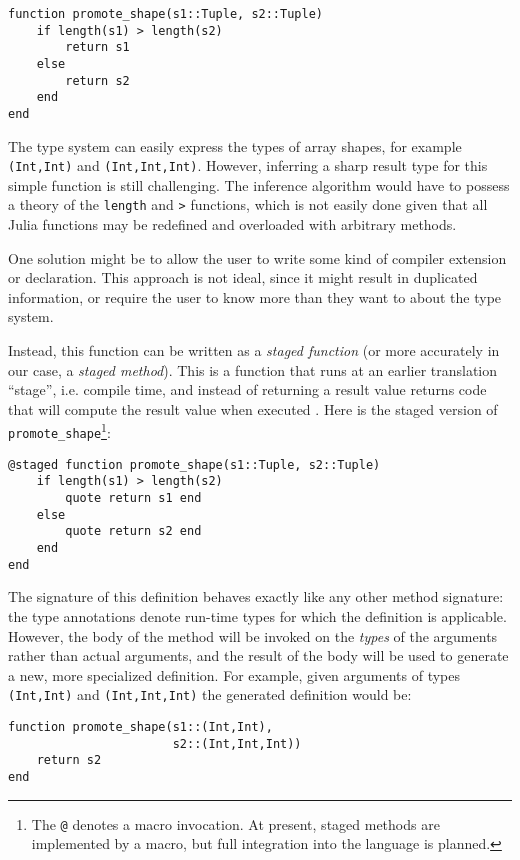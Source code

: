 \documentclass[9pt]{sigplanconf}
\begin{document}
\begin{verbatim}
function promote_shape(s1::Tuple, s2::Tuple)
    if length(s1) > length(s2)
        return s1
    else
        return s2
    end
end
\end{verbatim}

The type system can easily express the types of array shapes, for example
{\tt (Int,Int)} and {\tt (Int,Int,Int)}. However, inferring a sharp result
type for this simple function is still challenging. The inference algorithm
would have to possess a theory of the {\tt length} and {\tt >} functions,
which is not easily done given that all Julia functions may be redefined
and overloaded with arbitrary methods.

One solution might be to allow the user to write some kind of compiler
extension or declaration. This approach is not ideal, since it might
result in duplicated information, or require the user to know more than
they want to about the type system.

Instead, this function can be written as a \emph{staged function} (or
more accurately in our case, a \emph{staged method}). This is a function
that runs at an earlier translation ``stage'', i.e. compile time, and
instead of returning a result value returns code that will compute the
result value when executed \cite{staging}.
Here is the staged version of
{\tt promote\_shape}\footnote{The {\tt @} denotes a macro invocation. At
present, staged methods are implemented by a macro, but full integration
into the language is planned.}:

\begin{verbatim}
@staged function promote_shape(s1::Tuple, s2::Tuple)
    if length(s1) > length(s2)
        quote return s1 end
    else
        quote return s2 end
    end
end
\end{verbatim}

The signature of this definition behaves exactly like any other method
signature: the type annotations denote run-time types for which the
definition is applicable. However, the body of the method will be invoked
on the \emph{types} of the arguments rather than actual arguments, and the
result of the body will be used to generate a new, more specialized
definition. For example, given arguments of types
{\tt (Int,Int)} and {\tt (Int,Int,Int)} the generated definition would be:

\begin{verbatim}
function promote_shape(s1::(Int,Int), 
                       s2::(Int,Int,Int))
    return s2
end
\end{verbatim}
\end{document}
